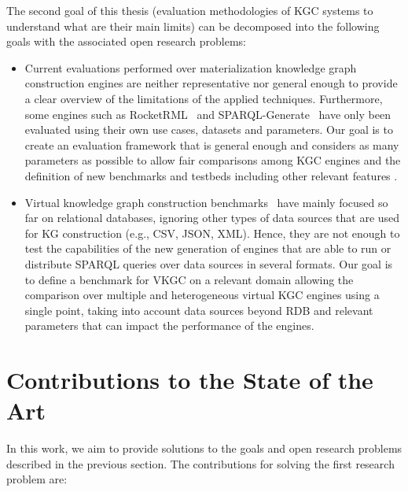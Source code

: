 The second goal of this thesis (evaluation methodologies of KGC systems to understand what are their main limits) can be decomposed into the following goals with the associated open research problems:
\begin{itemize}
    \item Current evaluations performed over materialization knowledge graph construction engines are neither representative nor general enough to provide a clear overview of the limitations of the applied techniques. Furthermore, some engines such as RocketRML~\citep{csimcsek2019rocketrml} and SPARQL-Generate~\citep{lefranccois2017sparql} have only been evaluated using their own use cases, datasets and parameters. Our goal is to create an evaluation framework that is general enough and considers as many parameters as possible to allow fair comparisons among KGC engines and the definition of new benchmarks and testbeds including other relevant features .
    \item Virtual knowledge graph construction benchmarks~\citep{lanti2015npd,bizer2009berlin} have mainly focused so far on relational databases, ignoring other types of data sources that are used for KG construction (e.g., CSV, JSON, XML). Hence, they are not enough to test the capabilities of the new generation of engines that are able to run or distribute SPARQL queries over data sources in several formats. Our goal is to define a benchmark for VKGC on a relevant domain allowing the comparison over multiple and heterogeneous virtual KGC engines using a single point, taking into account data sources beyond RDB and relevant parameters that can impact the performance of the engines.
\end{itemize}

\section{Contributions to the State of the Art}
In this work, we aim to provide solutions to the goals and open research problems described in the previous section. The contributions for solving the first research problem are:

